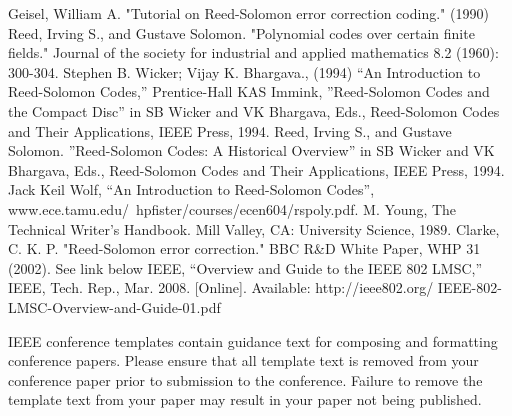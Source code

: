 \documentclass[conference]{IEEEtran}
\begin{document}
\begin{thebibliography}{00}
 Geisel, William A. "Tutorial on Reed-Solomon error correction coding." (1990)
 Reed, Irving S., and Gustave Solomon. "Polynomial codes over certain finite fields." Journal of the society for industrial and applied mathematics 8.2 (1960): 300-304.
 Stephen B. Wicker; Vijay K. Bhargava., (1994) “An Introduction to Reed-Solomon Codes,” Prentice-Hall
 KAS Immink, ''Reed-Solomon Codes and the Compact Disc'' in SB Wicker and VK
Bhargava, Eds., Reed-Solomon Codes and Their Applications, IEEE Press, 1994.
 Reed, Irving S., and Gustave Solomon. ''Reed-Solomon Codes: A Historical Overview'' in SB Wicker and VK Bhargava, Eds., Reed-Solomon Codes and Their Applications, IEEE Press, 1994.
 Jack Keil Wolf, “An Introduction to Reed-Solomon Codes”, www.ece.tamu.edu/~hpfister/courses/ecen604/rspoly.pdf.
 M. Young, The Technical Writer's Handbook. Mill Valley, CA: University Science, 1989.
 Clarke, C. K. P. "Reed-Solomon error correction." BBC R\&D White Paper, WHP 31 (2002).
 See link below 
 IEEE, “Overview and Guide to the IEEE 802 LMSC,” IEEE,
Tech. Rep., Mar. 2008. [Online]. Available: http://ieee802.org/
IEEE-802-LMSC-Overview-and-Guide-01.pdf
\end{thebibliography}

\vspace{12pt}
\color{red}
IEEE conference templates contain guidance text for composing and formatting conference papers. Please ensure that all template text is removed from your conference paper prior to submission to the conference. Failure to remove the template text from your paper may result in your paper not being published.
\end{document}
